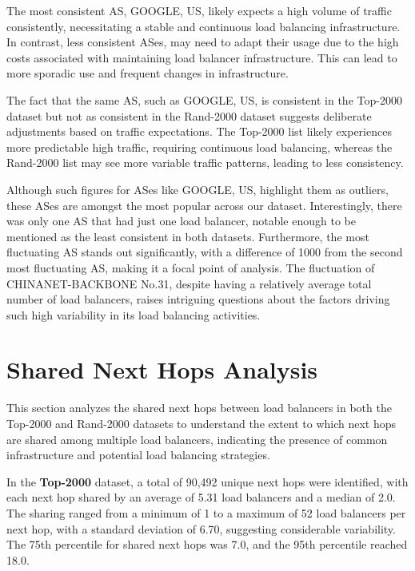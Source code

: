 \documentclass[12pt]{cwru_thesis}
\begin{document}
The most consistent AS, GOOGLE, US, likely expects a high volume of traffic consistently, necessitating a stable and continuous load balancing infrastructure. In contrast, less consistent ASes, may need to adapt their usage due to the high costs associated with maintaining load balancer infrastructure. This can lead to more sporadic use and frequent changes in infrastructure.

The fact that the same AS, such as GOOGLE, US, is consistent in the Top-2000 dataset but not as consistent in the Rand-2000 dataset suggests deliberate adjustments based on traffic expectations. The Top-2000 list likely experiences more predictable high traffic, requiring continuous load balancing, whereas the Rand-2000 list may see more variable traffic patterns, leading to less consistency.

Although such figures for ASes like GOOGLE, US, highlight them as outliers, these ASes are amongst the most popular across our dataset. Interestingly, there was only one AS that had just one load balancer, notable enough to be mentioned as the least consistent in both datasets. Furthermore, the most fluctuating AS stands out significantly, with a difference of 1000 from the second most fluctuating AS, making it a focal point of analysis. The fluctuation of CHINANET-BACKBONE No.31, despite having a relatively average total number of load balancers, raises intriguing questions about the factors driving such high variability in its load balancing activities.

\newpage



\section{Shared Next Hops Analysis}

This section analyzes the shared next hops between load balancers in both the Top-2000 and Rand-2000 datasets to understand the extent to which next hops are shared among multiple load balancers, indicating the presence of common infrastructure and potential load balancing strategies.

In the \textbf{Top-2000} dataset, a total of 90,492 unique next hops were identified, with each next hop shared by an average of 5.31 load balancers and a median of 2.0. The sharing ranged from a minimum of 1 to a maximum of 52 load balancers per next hop, with a standard deviation of 6.70, suggesting considerable variability. The 75th percentile for shared next hops was 7.0, and the 95th percentile reached 18.0.
\end{document}
